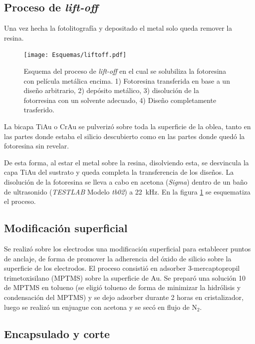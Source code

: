 	\subsection{Proceso de\textit{ lift-off}}
			Una vez hecha la fotolitografía y depositado el metal solo queda remover la resina.
					\begin{figure}[!ht]
							  \begin{center}
							  \texttt{[image: Esquemas/liftoff.pdf]}
							  \caption[Esquema del proceso de\textit{ lift-off}]{Esquema del proceso de\textit{ lift-off} en el cual se solubiliza la fotoresina con película metálica encima. 1) Fotoresina transferida en base a un diseño arbitrario, 2) depósito metálico, 3) disolución de la fotorresina con un solvente adecuado, 4) Diseño completamente trasferido.}
							  \label{esq:liftoff}
							  \end{center}
							  \end{figure}

		 La bicapa Ti\textbar Au o Cr\textbar Au se pulverizó sobre toda la superficie de la oblea, tanto en las partes donde estaba el silicio descubierto como en las partes donde quedó la fotoresina sin revelar. 
			
		De esta forma, al estar el metal sobre la resina, disolviendo esta, se desvincula la capa Ti\textbar Au del sustrato y queda completa la transferencia de los diseños. 
		La disolución de la fotoresina se lleva a cabo en acetona (\textit{Sigma}) dentro de un baño de ultrasonido (\textit{TESTLAB} Modelo \textit{tb02}) a \SI{22}{\kHz}. En la figura \ref{esq:liftoff} se esquematiza el proceso.

	\subsection{Modificación superficial}\label{sec:silanizacion}
		
		Se realizó sobre los electrodos una modificación superficial para establecer puntos de anclaje, de forma de promover la adherencia del óxido de silicio sobre la superficie de los electrodos.
		El proceso consistió en adsorber 3-mercaptopropil trimetoxisilano (MPTMS) sobre la superficie de Au. Se preparó una solución \SI{10}{\milli\Molar} de MPTMS en tolueno (se eligió tolueno de forma de minimizar la hidrólisis y condensación del MPTMS) y se dejo adsorber durante 2 horas en cristalizador, luego se realizó un enjuague con acetona y se secó en flujo de N$_2$.

	\subsection{Encapsulado y corte}\label{sec:corte}

